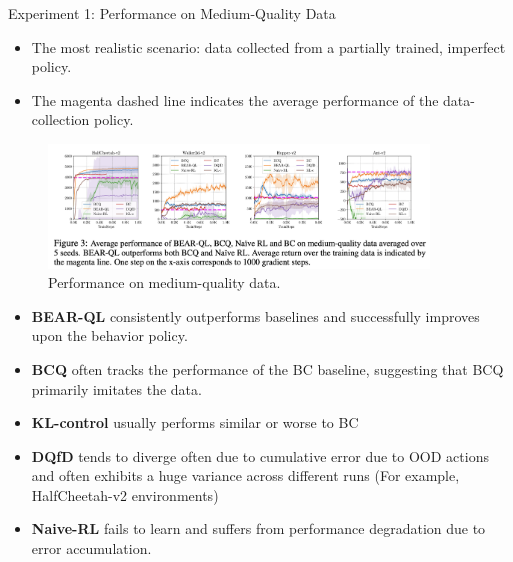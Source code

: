 \documentclass[11pt]{beamer}
\newcommand{\tb}[1]{\textbf{#1}}
\begin{document}
\begin{frame}{Experiment 1: Performance on Medium-Quality Data}
    \begin{itemize}
        \item The most realistic scenario: data collected from a partially trained, imperfect policy.
        \item The magenta dashed line indicates the average performance of the data-collection policy.
    \end{itemize}
    
    \begin{figure}
        \centering
        \includegraphics[width=0.9\textwidth]{Figure3.png}
        \caption{Performance on medium-quality data.}
    \end{figure}
    
    \begin{itemize}
        \item \tb{BEAR-QL} consistently outperforms baselines and successfully improves upon the behavior policy.
        \item \tb{BCQ} often tracks the performance of the BC baseline, suggesting that BCQ primarily imitates the data.
        \item \tb{KL-control} usually performs similar or worse to BC
        \item \tb{DQfD} tends to diverge often due to cumulative error due to OOD actions and often exhibits a huge variance across different runs (For example, HalfCheetah-v2 environments)
        \item \tb{Naive-RL} fails to learn and suffers from performance degradation due to error accumulation.
    \end{itemize}
\end{frame}
\end{document}
